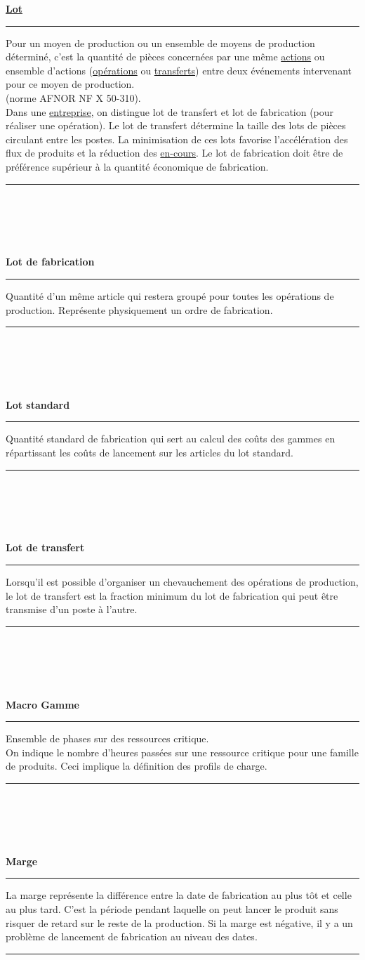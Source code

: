 \documentclass[12pt,a4paper,twoside]{article}
\newcommand{\definition}[3]{
	\begin{minipage}{\textwidth}
		\textbf{\large{#1}}\\
		\rule{\textwidth}{0.5pt}
		#2\\
		\ifthenelse{\isempty{#3}}%
	    {}%
	    {\rule{\textwidth}{0.25pt}\\\textit{#3}}%
    \end{minipage}
    \\\\
}
\begin{document}
\definition{\href{http://gpr.insa-lyon.fr/supgedem/Home/Le_monde_industriel/L_entreprise/La_gestion_de_production/Le_pilotage_des_taches_et_des_ressources/leslots.htm}{Lot}}
{
	Pour un moyen de production ou un ensemble de moyens de production déterminé, c'est la quantité de pièces concernées par une même \href{http://gpr.insa-lyon.fr/supgedem/Home/glossaire/gLesactions.htm}{actions} ou ensemble d'actions (\href{http://gpr.insa-lyon.fr/supgedem/Home/glossaire/glesoper.htm}{opérations} ou \href{http://gpr.insa-lyon.fr/supgedem/Home/Le_monde_industriel/L_entreprise/Le_systeme_physique_de_production/letransfert.htm}{transferts}) entre deux événements intervenant pour ce moyen de production.\\(norme AFNOR NF X 50-310).\\
	Dans une \href{http://gpr.insa-lyon.fr/supgedem/Home/Le_monde_industriel/L_entreprise/lentreprise.htm}{entreprise}, on distingue lot de transfert et lot de fabrication (pour réaliser une opération). Le lot de transfert détermine la taille des lots de pièces circulant entre les postes. La minimisation de ces lots favorise l'accélération des flux de produits et la réduction des \href{http://gpr.insa-lyon.fr/supgedem/Home/Le_monde_industriel/L_entreprise/Le_systeme_physique_de_production/lencours.htm}{en-cours}. Le lot de fabrication doit être de préférence supérieur à la quantité économique de fabrication.
	}{}
		
\definition{Lot de fabrication}
{
	Quantité d'un même article qui restera groupé pour toutes les opérations de production. Représente physiquement un ordre de fabrication.
	}{}
			
\definition{Lot standard}
{
	Quantité standard de fabrication qui sert au calcul des coûts des gammes en répartissant les coûts de lancement sur les articles du lot standard.
	}{}
		
\definition{Lot de transfert}
{
	Lorsqu'il est possible d'organiser un chevauchement des opérations de production, le lot de transfert est la fraction minimum du lot de fabrication qui peut être transmise d'un poste à l'autre.
	}{}

\definition{Macro Gamme}
{
	Ensemble de phases sur des ressources critique.\\
	On indique le nombre d'heures passées sur une ressource critique pour une famille de produits. Ceci implique la définition des profils de charge.	
	}{}

\definition{Marge}
{
	La marge représente la différence entre la date de fabrication au plus tôt et celle au plus tard. C'est la période pendant laquelle on peut lancer le produit sans risquer de retard sur le reste de la production. Si la marge est négative, il y a un problème de lancement de fabrication au niveau des dates.
	}{}
	
\end{document}
